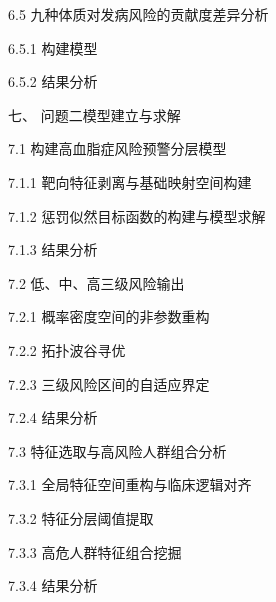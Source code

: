 \documentclass[12pt]{article}
\begin{document}
{		\noindent \hspace*{2em} 6.5 九种体质对发病风险的贡献度差异分析  \par
		\noindent \hspace*{4em} 6.5.1 构建模型  \par
		\noindent \hspace*{4em} 6.5.2 结果分析  \par
		
		\noindent 七、 问题二模型建立与求解  \par
		\noindent \hspace*{2em} 7.1 构建高血脂症风险预警分层模型  \par
		\noindent \hspace*{4em} 7.1.1 靶向特征剥离与基础映射空间构建  \par
		\noindent \hspace*{4em} 7.1.2 惩罚似然目标函数的构建与模型求解  \par
		\noindent \hspace*{4em} 7.1.3 结果分析  \par
		
		\noindent \hspace*{2em} 7.2 低、中、高三级风险输出  \par
		\noindent \hspace*{4em} 7.2.1 概率密度空间的非参数重构  \par
		\noindent \hspace*{4em} 7.2.2 拓扑波谷寻优  \par
		\noindent \hspace*{4em} 7.2.3 三级风险区间的自适应界定  \par
		\noindent \hspace*{4em} 7.2.4 结果分析  \par
		
		\noindent \hspace*{2em} 7.3 特征选取与高风险人群组合分析  \par
		\noindent \hspace*{4em} 7.3.1 全局特征空间重构与临床逻辑对齐  \par
		\noindent \hspace*{4em} 7.3.2 特征分层阈值提取  \par
		\noindent \hspace*{4em} 7.3.3 高危人群特征组合挖掘  \par
		\noindent \hspace*{4em} 7.3.4 结果分析  \par
		
}
\end{document}
